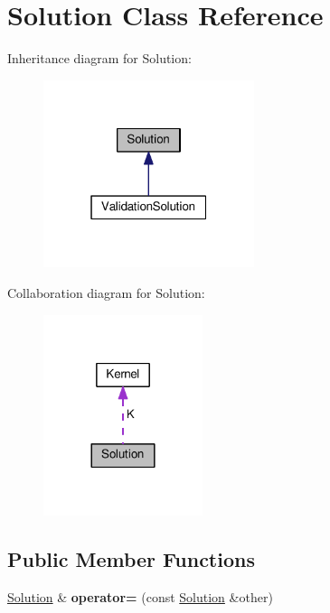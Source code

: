 \hypertarget{class_solution}{}\section{Solution Class Reference}
\label{class_solution}


Inheritance diagram for Solution\+:\nopagebreak
\begin{figure}[H]
\begin{center}
\leavevmode
\includegraphics[width=175pt]{class_solution__inherit__graph}
\end{center}
\end{figure}


Collaboration diagram for Solution\+:\nopagebreak
\begin{figure}[H]
\begin{center}
\leavevmode
\includegraphics[width=132pt]{class_solution__coll__graph}
\end{center}
\end{figure}
\subsection*{Public Member Functions}
\begin{DoxyCompactItemize}
\item 
\mbox{\label{class_solution_a8da0e412cdefa6e44c35fc5a8b96ee02}} 
\hyperlink{class_solution}{Solution} \& {\bfseries operator=} (const \hyperlink{class_solution}{Solution} \&other)
\end{DoxyCompactItemize}
